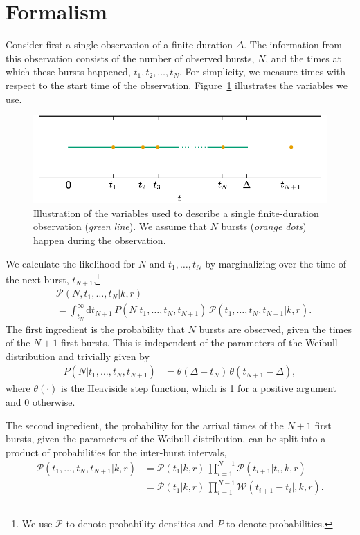 \documentclass[fleqn,usenatbib]{mnras}
\newcommand{\new}[1]{#1}
\begin{document}
\section{Formalism}
\label{sec:formalism}

Consider first a single observation of a finite duration $\Delta$. The information from this observation consists of the number of observed bursts, $N$, and the times at which these bursts happened, $t_1, t_2,\dots, t_N$. For simplicity, we measure times with respect to the start time of the observation. Figure~\ref{fig:singleinterval} illustrates the variables we use.

\begin{figure}
	\includegraphics[width=\columnwidth]{singleinterval.pdf}
	\caption{\label{fig:singleinterval}Illustration of the variables used to describe a single finite-duration observation (\emph{green line}). We assume that $N$ bursts (\emph{orange dots}) happen during the observation.}
\end{figure}

We calculate the likelihood for $N$ and $t_1,\dots,t_N$ by marginalizing over the time of the next burst, $t_{N+1}$,\footnote{We use $\mathcal{P}$ to denote probability densities and $P$ to denote probabilities.}
\begin{align}
	\label{eq:likelihood_firstsplit}
	&\mathcal{P}(N,t_1,\dots,t_N|k,r)\nonumber\\
	&= \int_{t_N}^\infty \mathrm{d}t_{N+1} \, P(N|t_1,\dots,t_N,t_{N+1}) \, \mathcal{P}(t_1,\dots,t_N,t_{N+1}|k,r).
\end{align}
The first ingredient is the probability that $N$ bursts are observed, given the times of the $N+1$ first bursts. This is independent of the parameters of the Weibull distribution and trivially given by
\begin{align}
	P(N|t_1,\dots,t_N,t_{N+1}) &= \theta(\Delta - t_N) \, \theta(t_{N+1} - \Delta),
\end{align}
where $\theta(\cdot)$ is the Heaviside step function, which is 1 for a positive argument and 0 otherwise.

The second ingredient, the probability for \new{the arrival times of the $N+1$ first bursts}, given the parameters of the Weibull distribution, can be split into a product of probabilities for the inter-burst intervals,
\begin{align}
	\label{eq:likelihood_times}
	\mathcal{P}(t_1,\dots,t_N,t_{N+1}|k,r) & = \mathcal{P}(t_1|k,r) \, \prod_{i = 1}^{N - 1} \mathcal{P}(t_{i+1}|t_{i},k,r)\nonumber\\
	&= \mathcal{P}(t_1|k,r) \, \prod_{i = 1}^{N - 1} \mathcal{W}(t_{i+1} - t_i|,k,r).
\end{align}
\end{document}
